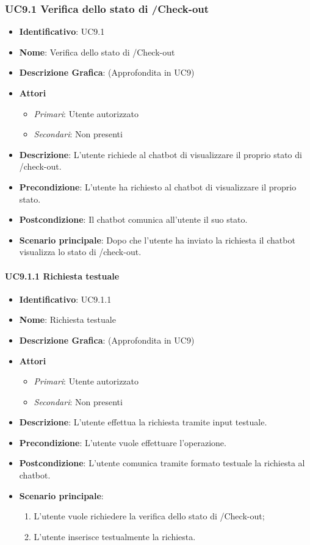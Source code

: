 \subsubsection{UC9.1 Verifica dello stato di /Check-out}
\begin{itemize}
	\item \textbf{Identificativo}: UC9.1
	\item \textbf{Nome}: Verifica dello stato di /Check-out
	\item \textbf{Descrizione Grafica}: (Approfondita in UC9)
	\item \textbf{Attori}
	\begin{itemize}
		\item \textit{Primari}: Utente autorizzato
		\item \textit{Secondari}: Non presenti
	\end{itemize}
	\item \textbf{Descrizione}: L'utente richiede al chatbot di visualizzare il proprio stato di /check-out.
	\item \textbf{Precondizione}: L'utente ha richiesto al chatbot di visualizzare il proprio stato.
	\item \textbf{Postcondizione}: Il chatbot comunica all'utente il suo stato.
	\item \textbf{Scenario principale}: Dopo che l'utente ha inviato la richiesta il chatbot visualizza lo stato di /check-out.
\end{itemize}

\paragraph{UC9.1.1 Richiesta testuale}
\begin{itemize}
	\item \textbf{Identificativo}: UC9.1.1
	\item \textbf{Nome}: Richiesta testuale
	\item \textbf{Descrizione Grafica}: (Approfondita in UC9)
	\item \textbf{Attori}
	\begin{itemize}
		\item \textit{Primari}: Utente autorizzato
		\item \textit{Secondari}: Non presenti
	\end{itemize}
	\item \textbf{Descrizione}: L'utente effettua la richiesta tramite input testuale.
	\item \textbf{Precondizione}: L'utente vuole effettuare l'operazione.
	\item \textbf{Postcondizione}: L'utente comunica tramite formato testuale la richiesta al chatbot.
	\item \textbf{Scenario principale}: 
	\begin{enumerate}
		\item L'utente vuole richiedere la verifica dello stato di /Check-out;
		\item L'utente inserisce testualmente la richiesta.
	\end{enumerate}
\end{itemize}


